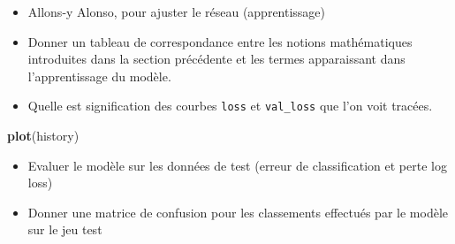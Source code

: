 \documentclass[]{article}
\newenvironment{Shaded}{\begin{snugshade}}{\end{snugshade}}
\newcommand{\KeywordTok}[1]{\textcolor[rgb]{0.13,0.29,0.53}{\textbf{#1}}}
\newcommand{\DataTypeTok}[1]{\textcolor[rgb]{0.13,0.29,0.53}{#1}}
\newcommand{\DecValTok}[1]{\textcolor[rgb]{0.00,0.00,0.81}{#1}}
\newcommand{\StringTok}[1]{\textcolor[rgb]{0.31,0.60,0.02}{#1}}
\newcommand{\OperatorTok}[1]{\textcolor[rgb]{0.81,0.36,0.00}{\textbf{#1}}}
\newcommand{\NormalTok}[1]{#1}
\providecommand{\tightlist}{%
  \setlength{\itemsep}{0pt}\setlength{\parskip}{0pt}}
\begin{document}
\begin{itemize}
\tightlist
\item
  Allons-y Alonso, pour ajuster le réseau (apprentissage)
\end{itemize}

\begin{Shaded}
\end{Shaded}

\begin{itemize}
\item
  Donner un tableau de correspondance entre les notions mathématiques
  introduites dans la section précédente et les termes apparaissant dans
  l'apprentissage du modèle.
\item
  Quelle est signification des courbes \texttt{loss} et
  \texttt{val\_loss} que l'on voit tracées.
\end{itemize}

\begin{Shaded}
\begin{Highlighting}[]
\KeywordTok{plot}\NormalTok{(history)}
\end{Highlighting}
\end{Shaded}

\begin{itemize}
\tightlist
\item
  Evaluer le modèle sur les données de test (erreur de classification et
  perte log loss)
\end{itemize}

\begin{Shaded}
\end{Shaded}

\begin{itemize}
\tightlist
\item
  Donner une matrice de confusion pour les classements effectués par le
  modèle sur le jeu test
\end{itemize}
\end{document}

